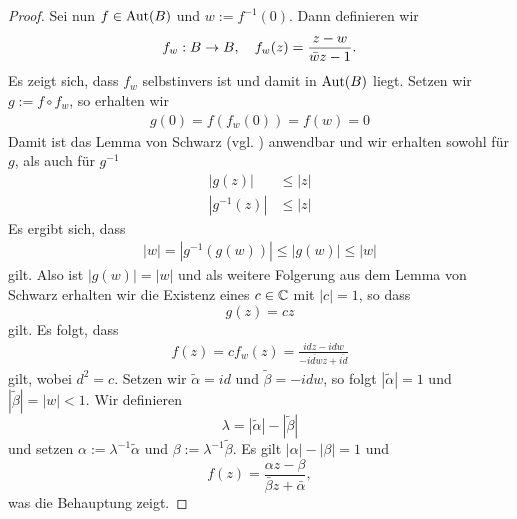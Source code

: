 \begin{proof}
  Sei nun $f \in \operatorname{Aut}(B)$ und $w := f^{-1}(0)$. Dann definieren wir
  \[
  f_w : B \rightarrow B, \quad f_w(z) = \frac{z -w}{\bar w z - 1}.
  \]
  Es zeigt sich, dass $f_w$ selbstinvers ist und damit in $\operatorname{Aut}(B)$
  liegt. Setzen wir $g := f\circ f_w$, so erhalten wir
  \begin{align*}
    g(0) = f( f_w(0)) = f(w) = 0
  \end{align*}
  Damit ist das Lemma von Schwarz (vgl. \cite[Satz 5.10]{Kas})
  anwendbar und wir erhalten sowohl für $g$, als auch für $g^{-1}$
  \begin{align*}
    |g(z)| & \leq |z| \\
    |g^{-1}(z)| & \leq |z|
  \end{align*}
  Es ergibt sich, dass
  \begin{align*}
    |w| = |g^{-1}(g(w))| \leq |g(w)| \leq |w|
  \end{align*}
  gilt. Also ist $|g(w)| = |w|$ und als weitere Folgerung aus dem Lemma
  von Schwarz erhalten wir die Existenz eines $c \in \mathbb{C}$ mit $|c| =
  1$, so dass
  \[
  g(z) = cz
  \]
  gilt. Es folgt, dass
  \begin{align*}
    f(z) = c f_w(z) = \frac{i dz - i dw}{ - \overline{idw} z +
      \overline{i d}}
  \end{align*}
  gilt, wobei $d^2 = c$. Setzen wir $\tilde \alpha = i d$ und $\tilde
  \beta = - i d w$, so folgt $|\tilde \alpha| = 1$ und $|\tilde \beta|
  = |w| < 1$. Wir definieren
  \[
  \lambda = |\tilde \alpha| - |\tilde \beta|
  \]
  und setzen $\alpha := \lambda^{-1} \tilde \alpha$ und $\beta :=
  \lambda^{-1} \tilde \beta$. Es gilt $|\alpha| - |\beta| = 1$ und
  \[
  f(z) = \frac{\alpha z - \beta}{\bar \beta z  + \bar \alpha},
  \]
  was die Behauptung zeigt.


\end{proof}
